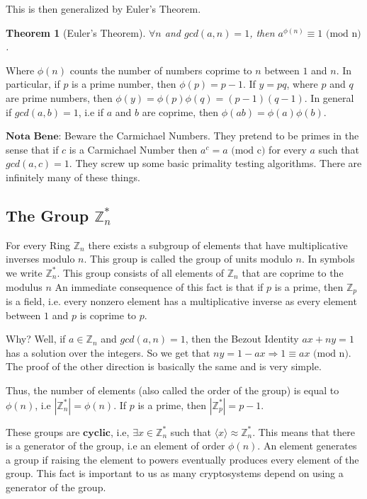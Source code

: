 \documentclass[12pt,a4paper]{article}
\newtheorem{thm}{Theorem}
\begin{document}
This is then generalized by Euler's Theorem.

\begin{thm}[Euler's Theorem]
$\forall n$ and $gcd(a, n) = 1$, then $a^{\phi(n)} \equiv 1 \text{ (mod n)}$. 
\end{thm}
Where $\phi(n)$ counts the number of numbers coprime to $n$ between $1$ and $n$. In particular, if $p$ is a prime number, then $\phi(p) = p-1$. If $y = pq$, where $p$ and $q$ are prime numbers, then $\phi(y) = \phi(p)\phi(q) = (p-1)(q-1)$. In general if $gcd(a, b) = 1$, i.e if $a$ and $b$ are coprime, then $\phi(ab) = \phi(a)\phi(b)$. 

$\textbf{Nota Bene:}$ Beware the Carmichael Numbers. They pretend to be primes in the sense that if $c$ is a Carmichael Number then $a^{c} = a \text{ (mod c)}$ for every $a$ such that $gcd(a, c) = 1$. They screw up some basic primality testing algorithms. There are infinitely many of these things. 

\subsection{The Group $\mathbb{Z}_{n}^{\ast}$}
For every Ring $\mathbb{Z}_{n}$ there exists a subgroup of elements that have multiplicative inverses modulo $n$. This group is called the group of units modulo $n$. In symbols we write $\mathbb{Z}_{n}^{\ast}$. This group consists of all elements of $\mathbb{Z}_{n}$ that are coprime to the modulus $n$ An immediate consequence of this fact is that if $p$ is a prime, then $\mathbb{Z}_{p}$ is a field, i.e. every nonzero element has a multiplicative inverse as every element between $1$ and $p$ is coprime to $p$.

Why? Well, if $a \in \mathbb{Z}_{n}$ and $gcd(a, n) = 1$, then the Bezout Identity $ax + ny = 1$ has a solution over the integers. So we get that $ny = 1 - ax \Rightarrow 1 \equiv ax \text{ (mod n)}$. The proof of the other direction is basically the same and is very simple.  

Thus, the number of elements (also called the order of the group) is equal to $\phi(n)$, i.e $|\mathbb{Z}_{n}^{\ast}| = \phi(n)$. If $p$ is a prime, then $|\mathbb{Z}_{p}^{\ast}| = p-1$.  

These groups are $\textbf{cyclic}$, i.e, $\exists x\in \mathbb{Z}_{n}^{\ast}$ such that $\langle x \rangle \approx \mathbb{Z}_{n}^{\ast}$. This means that there is a generator of the group, i.e an element of order $\phi(n)$. An element generates a group if raising the element to powers eventually produces every element of the group. This fact is important to us as many cryptosystems depend on using a generator of the group. 
\end{document}
